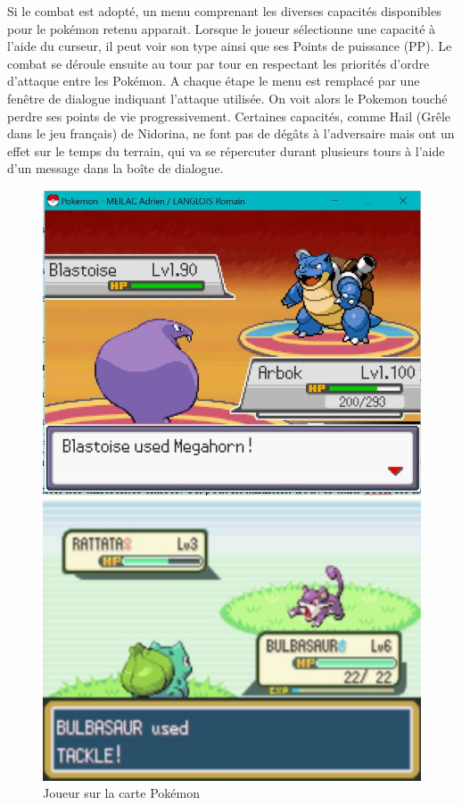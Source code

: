 \documentclass[a4paper,twoside, openany,11pt]{book}
\begin{document}
Si le combat est adopté, un menu comprenant les diverses capacités disponibles pour le pokémon retenu apparait. Lorsque le joueur sélectionne une capacité à l'aide du curseur, il peut voir son type ainsi que ses Points de puissance (PP). Le combat se déroule ensuite au tour par tour en respectant les priorités d'ordre d'attaque entre les Pokémon. A chaque étape le menu est remplacé par une fenêtre de dialogue indiquant l'attaque utilisée. On voit alors le Pokemon touché perdre ses points de vie progressivement. Certaines capacités, comme Hail (Grêle dans le jeu français) de Nidorina, ne font pas de dégâts à l'adversaire mais ont un effet sur le temps du terrain, qui va se répercuter durant plusieurs tours à l'aide d'un message dans la boîte de dialogue.

\begin{figure}[!h]
\begin{minipage}{0.49\textwidth}
\includegraphics[scale = 0.6]{Images/useMove.jpg}
\end{minipage}
\begin{minipage}{0.49\textwidth}
\includegraphics[scale = 0.84]{Images/vrai_jeu_useMove.jpg}
\end{minipage}
\caption{Joueur sur la carte Pokémon}
\end{figure}
\end{document}
